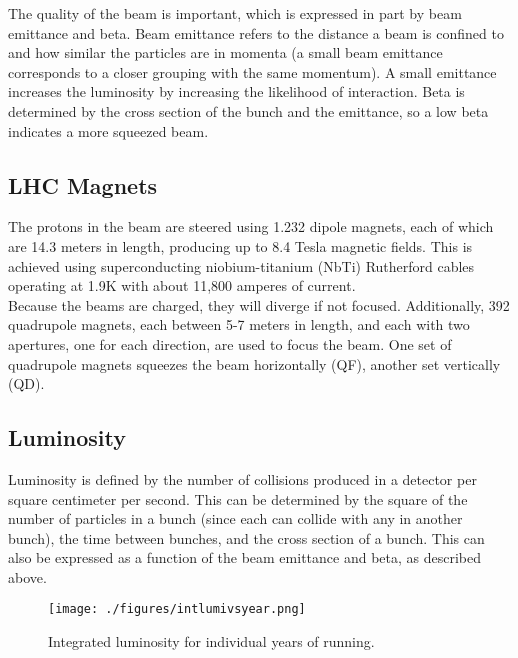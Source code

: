 The quality of the beam is important, which is expressed in part by beam emittance and beta.  Beam emittance refers to the distance a beam is confined to and how similar the particles are in momenta (a small beam emittance corresponds to a closer grouping with the same momentum).  A small emittance increases the luminosity by increasing the likelihood of interaction.  Beta is determined by the cross section of the bunch and the emittance, so a low beta indicates a more squeezed beam.\\


\subsection{LHC Magnets}

The protons in the beam are steered using 1.232 dipole magnets, each of which are 14.3 meters in length, producing up to 8.4 Tesla magnetic fields.  This is achieved using superconducting niobium-titanium (NbTi) Rutherford cables operating at 1.9K with about 11,800 amperes of current.  \\

Because the beams are charged, they will diverge if not focused.  Additionally, 392 quadrupole magnets, each between 5-7 meters in length, and each with two apertures, one for each direction, are used to focus the beam.  One set of quadrupole magnets squeezes the beam horizontally (QF), another set vertically (QD). \\%

\subsection{Luminosity}

Luminosity is defined by the number of collisions produced in a detector per square centimeter per second.  This can be determined by the square of the number of particles in a bunch (since each can collide with any in another bunch), the time between bunches, and the cross section of a bunch.  This can also be expressed as a function of the beam emittance and beta, as described above.  \\

\begin{figure}[h!]
  \centering
	\texttt{[image: ./figures/intlumivsyear.png]}
\caption{\label{fig:intLum}{ Integrated luminosity for individual years of running. }} %
\end{figure}

